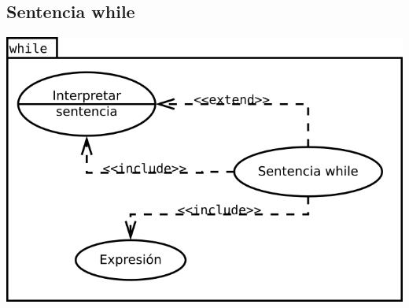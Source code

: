 \subsection {Sentencia while}
\begin{center}
\includegraphics[scale=0.4]{while.png} \\
\end{center}

